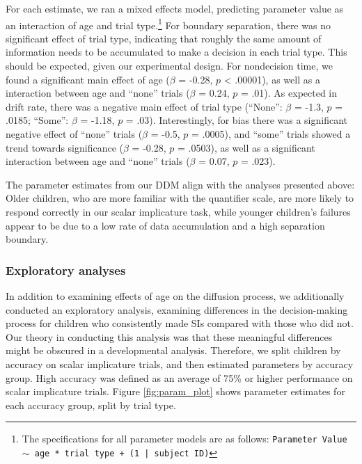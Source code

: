 \documentclass[10pt, letterpaper]{article}
\begin{document}
For each estimate, we ran a mixed effects model, predicting parameter
value as an interaction of age and trial
type.\footnote{The specifications for all parameter models are as follows: \texttt{Parameter Value $\sim$ age * trial type + (1 | subject ID)}}
For boundary separation, there was no significant effect of trial type,
indicating that roughly the same amount of information needs to be
accumulated to make a decision in each trial type. This should be
expected, given our experimental design. For nondecision time, we found
a significant main effect of age (\(\beta\) = -0.28, \(p\) \textless{}
.00001), as well as a interaction between age and ``none'' trials
(\(\beta\) = 0.24, \(p\) = .01). As expected in drift rate, there was a
negative main effect of trial type (``None'': \(\beta\) = -1.3, \(p\) =
.0185; ``Some'': \(\beta\) = -1.18, \(p\) = .03). Interestingly, for
bias there was a significant negative effect of ``none'' trials
(\(\beta\) = -0.5, \(p\) = .0005), and ``some'' trials showed a trend
towards significance (\(\beta\) = -0.28, \(p\) = .0503), as well as a
significant interaction between age and ``none'' trials (\(\beta\) =
0.07, \(p\) = .023).

The parameter estimates from our DDM align with the analyses presented
above: Older children, who are more familiar with the quantifier scale,
are more likely to respond correctly in our scalar implicature task,
while younger children's failures appear to be due to a low rate of data
accumulation and a high separation boundary.

\subsubsection{Exploratory analyses}\label{exploratory-analyses}

In addition to examining effects of age on the diffusion process, we
additionally conducted an exploratory analysis, examining differences in
the decision-making process for children who consistently made SIs
compared with those who did not. Our theory in conducting this analysis
was that these meaningful differences might be obscured in a
developmental analysis. Therefore, we split children by accuracy on
scalar implicature trials, and then estimated parameters by accuracy
group. High accuracy was defined as an average of 75\% or higher
performance on scalar implicature trials. Figure \ref{fig:param_plot}
shows parameter estimates for each accuracy group, split by trial type.
\end{document}
